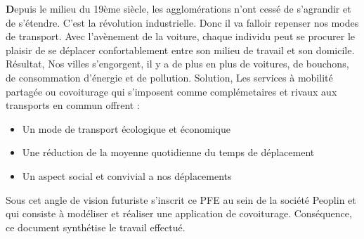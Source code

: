 
\begin{general}

\textbf{D}epuis le milieu du 19ème siècle, les agglomérations n’ont cessé de s’agrandir et de s’étendre. C’est la révolution industrielle. Donc il va falloir repenser nos modes de transport.\newline
Avec l’avènement de la voiture, chaque individu peut se procurer le plaisir de se déplacer confortablement entre son milieu de travail et son domicile.\newline
Résultat, Nos villes s’engorgent, il y a de plus en plus de voitures, de bouchons, de consommation d’énergie et de pollution.\newline
Solution, Les services à mobilité partagée ou covoiturage qui s’imposent comme complémetaires et rivaux aux transports en commun offrent :
\begin{itemize}
\item Un mode de transport écologique et économique
\item Une réduction de la moyenne quotidienne du temps de déplacement
\item Un aspect social et convivial a nos déplacements
\end{itemize}
Sous cet angle de vision futuriste s’inscrit ce PFE au sein de la société Peoplin et qui consiste à modéliser et réaliser une application de covoiturage.\newline
Conséquence, ce document synthétise le travail effectué.

\end{general}
